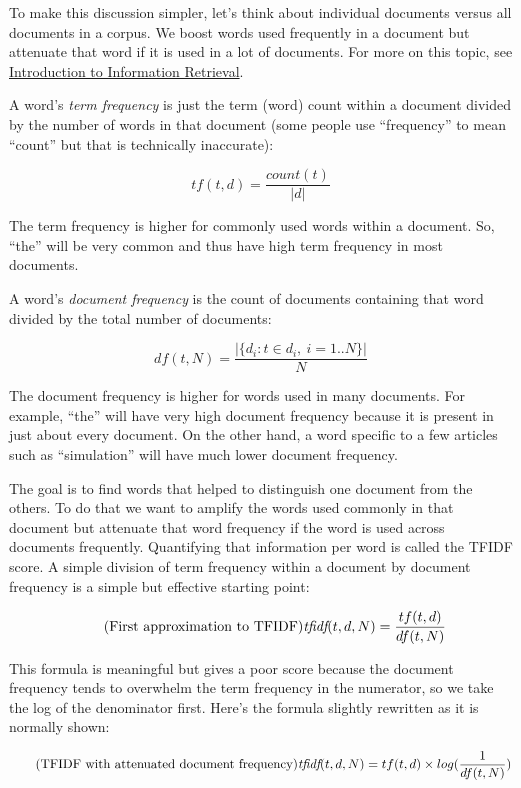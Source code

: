 \documentclass[10pt]{article}
\begin{document}
To make this discussion simpler, let's think about individual documents versus all documents in a corpus. We boost words used frequently in a document but attenuate  that word if it is used in a lot of documents.  For more on this topic, see \href{http://nlp.stanford.edu/IR-book/html/htmledition/term-frequency-and-weighting-1.html}{Introduction to Information Retrieval}.

A word's {\em term frequency} is just the term (word) count within a document divided by the number of words in that document (some people use ``frequency'' to mean ``count'' but that is technically inaccurate):

\[\tag{Term frequency of term $t \in d$, document $d$}
tf(t,d) = \frac{count(t)}{|d|}
\]

\noindent The term frequency is higher for commonly used words within a document. So, ``the'' will be very common and thus have high term frequency in most documents.

A word's {\em document frequency} is the count of documents containing that word divided by the total number of documents:

\[\tag{Document frequency of $t$ in $N$ documents}
df(t,N) = \frac{|\{d_i : t \in d_i, \ i = 1..N\}|}{N}
\]

\noindent The document frequency is higher for words used in many documents. For example, ``the'' will have very high document frequency because it is present in just about every document. On the other hand, a word specific to a few articles such as ``simulation'' will have much lower document frequency.

The goal is to find words that helped to distinguish one document from the others. To do that we want to amplify the words used commonly in that document but attenuate that word frequency if the word is used across documents frequently.  Quantifying that information per word is called the TFIDF score. A simple division of term frequency within a document by document frequency is a simple but effective starting point:

\[\tag{First approximation to TFIDF}
\text{\em tfidf}(t,d,N) = \frac{tf(t,d)}{df(t,N)}
\]

This formula is  meaningful but gives a poor score because the document frequency tends to overwhelm the term frequency in the numerator, so we take the log of the denominator first. Here's the formula slightly rewritten as it is normally shown:

\[\tag{TFIDF with attenuated document frequency}
\text{\em tfidf}(t,d,N) = tf(t,d) \times log(\frac{1}{df(t,N)})
\]
\end{document}
